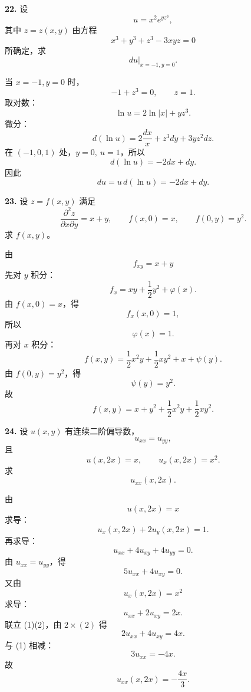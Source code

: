 \begin{problemblock}
\textbf{22.} 设
\[
u=x^2e^{yz^3},
\]
其中 \(z=z(x,y)\) 由方程
\[
x^3+y^3+z^3-3xyz=0
\]
所确定，求
\[
du\big|_{x=-1,y=0}.
\]
\end{problemblock}

\begin{solutionblock}
当 \(x=-1,y=0\) 时，
\[
-1+z^3=0,\qquad z=1.
\]
取对数：
\[
\ln u=2\ln|x|+yz^3.
\]
微分：
\[
d(\ln u)=2\frac{dx}{x}+z^3dy+3yz^2dz.
\]
在 \((-1,0,1)\) 处，\(y=0,\ u=1\)，所以
\[
d(\ln u)=-2dx+dy.
\]
因此
\[
du=u\,d(\ln u)=\boxed{-2dx+dy}.
\]
\end{solutionblock}

\begin{problemblock}
\textbf{23.} 设 \(z=f(x,y)\) 满足
\[
\frac{\partial^2z}{\partial x\partial y}=x+y,\qquad
f(x,0)=x,\qquad f(0,y)=y^2.
\]
求 \(f(x,y)\)。
\end{problemblock}

\begin{solutionblock}
由
\[
f_{xy}=x+y
\]
先对 \(y\) 积分：
\[
f_x=xy+\frac12y^2+\varphi(x).
\]
由 \(f(x,0)=x\)，得
\[
f_x(x,0)=1,
\]
所以
\[
\varphi(x)=1.
\]
再对 \(x\) 积分：
\[
f(x,y)=\frac12x^2y+\frac12xy^2+x+\psi(y).
\]
由 \(f(0,y)=y^2\)，得
\[
\psi(y)=y^2.
\]
故
\[
\boxed{f(x,y)=x+y^2+\frac12x^2y+\frac12xy^2}.
\]
\end{solutionblock}

\begin{problemblock}
\textbf{24.} 设 \(u(x,y)\) 有连续二阶偏导数，
\[
u_{xx}=u_{yy},
\]
且
\[
u(x,2x)=x,\qquad u_x(x,2x)=x^2.
\]
求
\[
u_{xx}(x,2x).
\]
\end{problemblock}

\begin{solutionblock}
由
\[
u(x,2x)=x
\]
求导：
\[
u_x(x,2x)+2u_y(x,2x)=1.
\]
再求导：
\[
u_{xx}+4u_{xy}+4u_{yy}=0.
\]
由 \(u_{xx}=u_{yy}\)，得
\[
5u_{xx}+4u_{xy}=0. \tag{1}
\]
又由
\[
u_x(x,2x)=x^2
\]
求导：
\[
u_{xx}+2u_{xy}=2x. \tag{2}
\]
联立 (1)(2)，由 \(2\times(2)\) 得
\[
2u_{xx}+4u_{xy}=4x.
\]
与 (1) 相减：
\[
3u_{xx}=-4x.
\]
故
\[
\boxed{u_{xx}(x,2x)=-\frac{4x}{3}}.
\]
\end{solutionblock}

